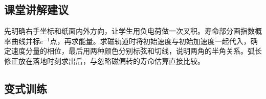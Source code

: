 \documentclass[UTF8,fontset=fandol,a4paper,11pt]{ctexart}
\begin{document}


\subsection*{课堂讲解建议}

先明确右手坐标和纸面内外方向，让学生用负电荷做一次叉积。寿命部分画指数概率曲线并标$e^{-1}$点，再求能量。求磁轨道时将初始速度与初始加速度一起代入，确定速度分量的相位，最后用两种颜色分别标弦和切线，说明两角的半角关系。弧长修正放在落地时刻求出后，与忽略磁偏转的寿命估算直接比较。



\subsection*{变式训练}
\end{document}
